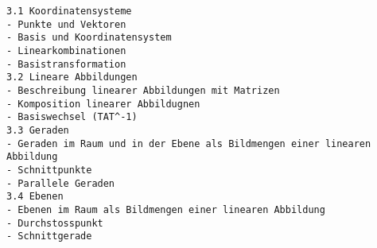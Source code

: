 \begin{verbatim}
3.1 Koordinatensysteme
- Punkte und Vektoren
- Basis und Koordinatensystem
- Linearkombinationen
- Basistransformation
3.2 Lineare Abbildungen
- Beschreibung linearer Abbildungen mit Matrizen
- Komposition linearer Abbildugnen
- Basiswechsel (TAT^-1)
3.3 Geraden
- Geraden im Raum und in der Ebene als Bildmengen einer linearen Abbildung
- Schnittpunkte
- Parallele Geraden
3.4 Ebenen
- Ebenen im Raum als Bildmengen einer linearen Abbildung
- Durchstosspunkt
- Schnittgerade
\end{verbatim}
